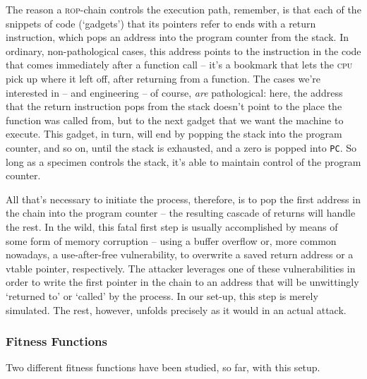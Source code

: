 The reason a \textsc{rop}-chain controls the execution path,
remember, is that each of the snippets of code (`gadgets') that
its pointers refer to ends with a return instruction, which pops
an address into the program counter from the stack. In ordinary,
non-pathological cases, this address points to the instruction in
the code that comes immediately after a function call -- it's a
bookmark that lets the \textsc{cpu} pick up where it left off,
after returning from a function. The cases we're interested in --
and engineering -- of course, \emph{are} pathological: here, the
address that the return instruction pops from the stack doesn't
point to the place the function was called from, but to the next
gadget that we want the machine to execute. This gadget, in turn,
will end by popping the stack into the program counter, and so
on, until the stack is exhausted, and a zero is popped into
\texttt{PC}. So long as a specimen controls the stack, it's able
to maintain control of the program counter. 


All that's necessary to initiate the process, therefore, is to
pop the first address in the chain into the program counter --
the resulting cascade of returns will handle the rest. In the
wild, this fatal first step is usually accomplished by means of
some form of memory corruption -- using a buffer overflow or,
more common nowadays, a use-after-free vulnerability, to
overwrite a saved return address or a vtable pointer,
respectively.  The attacker leverages one of these
vulnerabilities in order to write the first pointer in the chain
to an address that will be unwittingly `returned to' or `called'
by the process. In our set-up, this step is merely simulated. The
rest, however, unfolds precisely as it would in an actual
attack.

\subsubsection{Fitness Functions}

Two different fitness functions have been studied, so far, with
this setup. 

